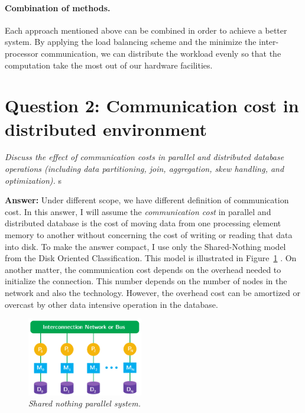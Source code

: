 \documentclass[a4paper,12pt]{article}
\begin{document}
\paragraph{Combination of methods.} Each approach mentioned above can be combined in order to achieve a better system. By applying the load balancing scheme and the minimize the inter-processor communication, we can distribute the workload evenly so that the computation take the most out of our hardware facilities.
 



\section*{Question 2: Communication cost in distributed environment}
\setcounter{section}{2}

\textit{Discuss the effect of communication costs in parallel and distributed database operations (including data partitioning, join, aggregation, skew handling, and optimization).} s

\vspace{1.5em}
\noindent
\textbf{Answer:} 
\noindent
Under different scope, we have different definition of communication cost. In this answer, I will assume the \emph{communication cost} in parallel and distributed database is the cost of moving data from one processing element memory to another without concerning the cost of writing or reading that data into disk. To make the answer compact, I use only the Shared-Nothing model from the Disk Oriented Classification. This model is illustrated in Figure~\ref{fig:model} \cite{lec9}. On another matter, the communication cost depends on the overhead needed to initialize the connection. This number depends on the number of nodes in the network and also the technology. However, the overhead cost can be amortized or overcast by other data intensive operation in the database.
\vspace{-1em}
\begin{figure}
    \vspace{2em}
    \centering
        \includegraphics[width=0.45\textwidth]{ade_final_model}
    \vspace{-0.5em}
    \caption{\emph{Shared nothing parallel system.}}
    \label{fig:model}
    \vspace{-6em}
\end{figure}
\end{document}
